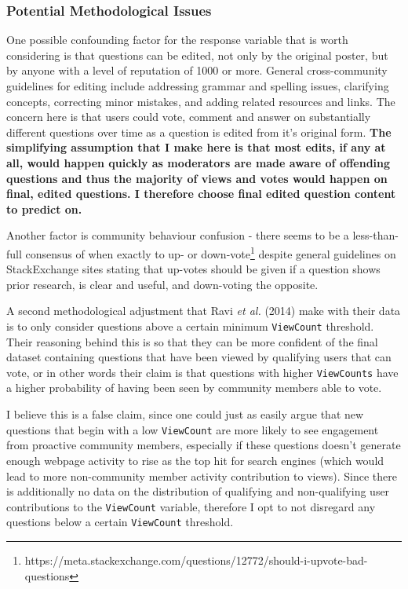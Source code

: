 \documentclass[11pt,preprint, authoryear]{article}
\numberwithin{equation}{section}
\let\rmarkdownfootnote\footnote%
\def\footnote{\protect\rmarkdownfootnote}
\begin{document}
\subsubsection{\texorpdfstring{Potential Methodological Issues
\label{Issues}}{Potential Methodological Issues }}\label{potential-methodological-issues}

One possible confounding factor for the response variable that is worth
considering is that questions can be edited, not only by the original
poster, but by anyone with a level of reputation of 1000 or more.
General cross-community guidelines for editing include addressing
grammar and spelling issues, clarifying concepts, correcting minor
mistakes, and adding related resources and links. The concern here is
that users could vote, comment and answer on substantially different
questions over time as a question is edited from it's original form.
\textbf{The simplifying assumption that I make here is that most edits,
if any at all, would happen quickly as moderators are made aware of
offending questions and thus the majority of views and votes would
happen on final, edited questions. I therefore choose final edited
question content to predict on.}

Another factor is community behaviour confusion - there seems to be a
less-than-full consensus of when exactly to up- or
down-vote\footnote{https://meta.stackexchange.com/questions/12772/should-i-upvote-bad-questions}
despite general guidelines on StackExchange sites stating that up-votes
should be given if a question shows prior research, is clear and useful,
and down-voting the opposite.

A second methodological adjustment that Ravi \emph{et al.} (2014) make
with their data is to only consider questions above a certain minimum
\texttt{ViewCount} threshold. Their reasoning behind this is so that
they can be more confident of the final dataset containing questions
that have been viewed by qualifying users that can vote, or in other
words their claim is that questions with higher \texttt{ViewCounts} have
a higher probability of having been seen by community members able to
vote.

I believe this is a false claim, since one could just as easily argue
that new questions that begin with a low \texttt{ViewCount} are more
likely to see engagement from proactive community members, especially if
these questions doesn't generate enough webpage activity to rise as the
top hit for search engines (which would lead to more non-community
member activity contribution to views). Since there is additionally no
data on the distribution of qualifying and non-qualifying user
contributions to the \texttt{ViewCount} variable, therefore I opt to not
disregard any questions below a certain \texttt{ViewCount} threshold.
\end{document}
